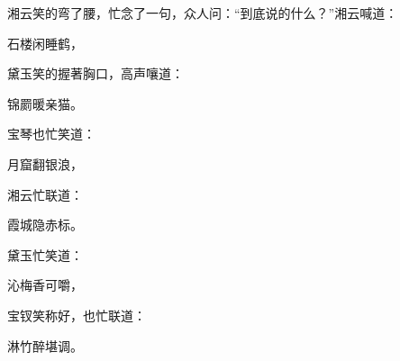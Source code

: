 \begin{parag}
    湘云笑的弯了腰，忙念了一句，众人问：“到底说的什么？”湘云喊道：
\end{parag}


\begin{poem}
    \begin{pl} 石楼闲睡鹤，\end{pl}
\end{poem}


\begin{parag}
    黛玉笑的握著胸口，高声嚷道：
\end{parag}


\begin{poem}
    \begin{pl} 锦罽暖亲猫。\end{pl}
\end{poem}


\begin{parag}
    宝琴也忙笑道：
\end{parag}


\begin{poem}
    \begin{pl} 月窟翻银浪，\end{pl}
\end{poem}


\begin{parag}
    湘云忙联道：
\end{parag}


\begin{poem}
    \begin{pl} 霞城隐赤标。\end{pl}
\end{poem}


\begin{parag}
    黛玉忙笑道：
\end{parag}


\begin{poem}
    \begin{pl} 沁梅香可嚼，\end{pl}
\end{poem}


\begin{parag}
    宝钗笑称好，也忙联道：
\end{parag}


\begin{poem}
    \begin{pl} 淋竹醉堪调。\end{pl}
\end{poem}


